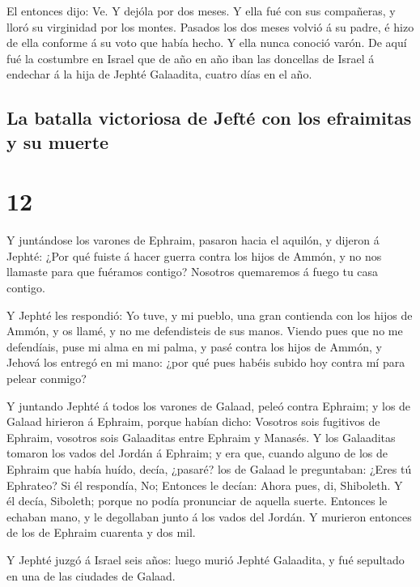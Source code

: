  El entonces dijo: Ve. Y dejóla por dos meses. Y ella fué
con sus compañeras, y lloró su virginidad por los montes.
 Pasados los dos meses volvió á su padre, é hizo de ella
conforme á su voto que había hecho. Y ella nunca conoció varón.
 De aquí fué la costumbre en Israel que de año en año
iban las doncellas de Israel á endechar á la hija de Jephté Galaadita,
cuatro días en el año.

\hypertarget{la-batalla-victoriosa-de-jeftuxe9-con-los-efraimitas-y-su-muerte}{%
\subsection{La batalla victoriosa de Jefté con los efraimitas y su
muerte}\label{la-batalla-victoriosa-de-jeftuxe9-con-los-efraimitas-y-su-muerte}}

\hypertarget{section-11}{%
\section{12}\label{section-11}}

 Y juntándose los varones de Ephraim, pasaron hacia el
aquilón, y dijeron á Jephté: ¿Por qué fuiste á hacer guerra contra los
hijos de Ammón, y no nos llamaste para que fuéramos contigo? Nosotros
quemaremos á fuego tu casa contigo.

 Y Jephté les respondió: Yo tuve, y mi pueblo, una gran
contienda con los hijos de Ammón, y os llamé, y no me defendisteis de
sus manos.  Viendo pues que no me defendíais, puse mi alma
en mi palma, y pasé contra los hijos de Ammón, y Jehová los entregó en
mi mano: ¿por qué pues habéis subido hoy contra mí para pelear conmigo?

 Y juntando Jephté á todos los varones de Galaad, peleó
contra Ephraim; y los de Galaad hirieron á Ephraim, porque habían dicho:
Vosotros sois fugitivos de Ephraim, vosotros sois Galaaditas entre
Ephraim y Manasés.  Y los Galaaditas tomaron los vados del
Jordán á Ephraim; y era que, cuando alguno de los de Ephraim que había
huído, decía, ¿pasaré? los de Galaad le preguntaban: ¿Eres tú Ephrateo?
Si él respondía, No;  Entonces le decían: Ahora pues, di,
Shiboleth. Y él decía, Siboleth; porque no podía pronunciar de aquella
suerte. Entonces le echaban mano, y le degollaban junto á los vados del
Jordán. Y murieron entonces de los de Ephraim cuarenta y dos mil.

 Y Jephté juzgó á Israel seis años: luego murió Jephté
Galaadita, y fué sepultado en una de las ciudades de Galaad.

